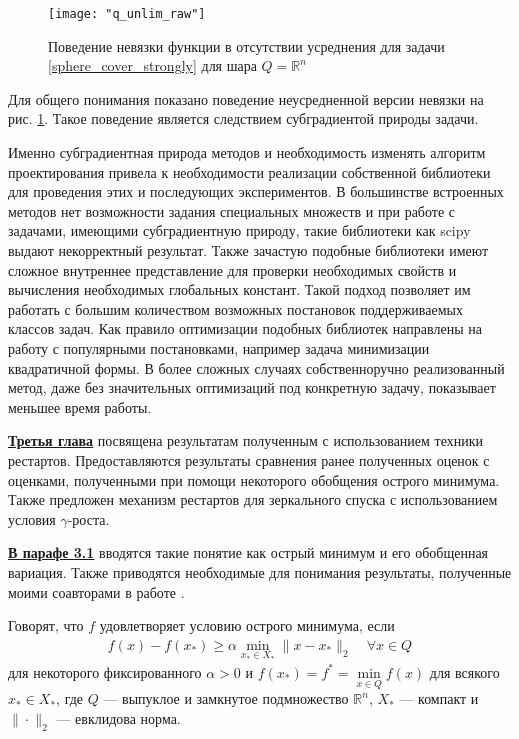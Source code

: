 \begin{figure}[h]
	\centering
	\texttt{[image: "q\_unlim\_raw"]}
    \caption{Поведение невязки функции в отсутствии усреднения для задачи \eqref{sphere_cover_strongly} для шара $Q = \mathbb{R}^n$}
    \label{non_avg}
\end{figure}

Для общего понимания показано поведение неусредненной версии невязки на рис. \ref{non_avg}. Такое поведение является следствием субградиентой природы задачи. 

Именно субградиентная природа методов и необходимость изменять алгоритм проектирования привела к необходимости реализации собственной библиотеки для проведения этих и последующих экспериментов. В большинстве встроенных методов нет возможности задания специальных  множеств и при работе с задачами, имеющими субградиентную природу, такие библиотеки как scipy выдают некорректный результат. Также зачастую подобные библиотеки имеют сложное внутреннее представление для проверки необходимых свойств и вычисления необходимых глобальных констант. Такой подход позволяет им работать с большим количеством возможных постановок поддерживаемых классов задач. Как правило оптимизации подобных библиотек направлены на работу с популярными постановками, например задача минимизации квадратичной формы. В более сложных случаях собственноручно реализованный метод, даже без значительных оптимизаций под конкретную задачу, показывает меньшее время работы. 


\underline{\textbf{Третья глава}} посвящена результатам полученным с использованием техники рестартов. Предоставляются результаты сравнения ранее полученных оценок с оценками, полученными при помощи некоторого обобщения острого минимума. Также предложен механизм рестартов для зеркального спуска с использованием условия $\gamma$-роста. 

\underline{\textbf{В парафе 3.1}} вводятся такие понятие как острый минимум и его обобщенная вариация. Также приводятся необходимые для понимания результаты, полученные моими соавторами в работе \cite{sharp22}. 

Говорят, что $f$ удовлетворяет условию острого минимума, если
\begin{gather}\label{sm}
    f(x) - f(x_*) \geq \alpha \min_{x_* \in X_*} \|x- x_*\|_2 \quad \forall x \in Q
\end{gather}
для некоторого фиксированного $\alpha >0$ и $f(x_*) = f^* = \min\limits_{x\in Q} f(x)$ для всякого $x_* \in X_*$, где $Q$ --- выпуклое и замкнутое подмножество $\mathbb{R}^n$, $X_*$ --- компакт и $\|\cdot\|_2$ --- евклидова норма. 

